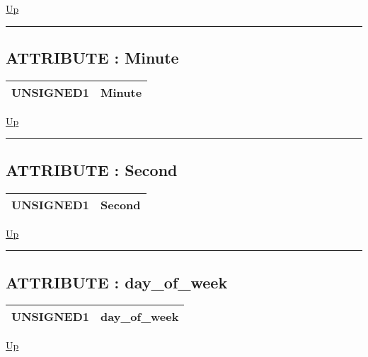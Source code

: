 \hyperlink{ecldoc:date.secondstoparts}{Up}

\par


\rule{\textwidth}{0.4pt}
\subsection*{ATTRIBUTE : Minute}
\hypertarget{ecldoc:date.secondstoparts.result.minute}{}

{\renewcommand{\arraystretch}{1.5}
\begin{tabularx}{\textwidth}{|>{\raggedright\arraybackslash}l|X|}
\hline
\hspace{0pt}UNSIGNED1 & Minute \\
\hline
\end{tabularx}
}

\hyperlink{ecldoc:date.secondstoparts}{Up}

\par


\rule{\textwidth}{0.4pt}
\subsection*{ATTRIBUTE : Second}
\hypertarget{ecldoc:date.secondstoparts.result.second}{}

{\renewcommand{\arraystretch}{1.5}
\begin{tabularx}{\textwidth}{|>{\raggedright\arraybackslash}l|X|}
\hline
\hspace{0pt}UNSIGNED1 & Second \\
\hline
\end{tabularx}
}

\hyperlink{ecldoc:date.secondstoparts}{Up}

\par


\rule{\textwidth}{0.4pt}
\subsection*{ATTRIBUTE : day\_of\_week}
\hypertarget{ecldoc:date.secondstoparts.result.day_of_week}{}

{\renewcommand{\arraystretch}{1.5}
\begin{tabularx}{\textwidth}{|>{\raggedright\arraybackslash}l|X|}
\hline
\hspace{0pt}UNSIGNED1 & day\_of\_week \\
\hline
\end{tabularx}
}

\hyperlink{ecldoc:date.secondstoparts}{Up}

